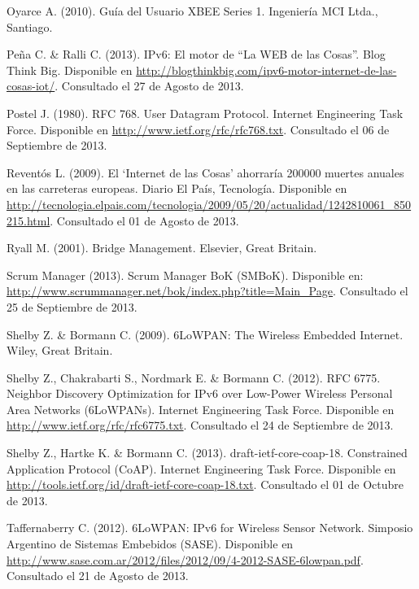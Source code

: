 \begin{spacing}{1.0}
\begin{thebibliography}{99}
Oyarce A. (2010).
\newblock Guía del Usuario XBEE Series 1.
\newblock Ingeniería MCI Ltda., Santiago.

Peña C. \& Ralli C. (2013).
\newblock IPv6: El motor de ``La WEB de las Cosas''. Blog Think Big.
\newblock Disponible en \url{http://blogthinkbig.com/ipv6-motor-internet-de-las-cosas-iot/}.
\newblock Consultado el 27 de Agosto de 2013.

Postel J. (1980).
\newblock RFC 768. User Datagram Protocol. Internet Engineering Task Force.
\newblock Disponible en \url{http://www.ietf.org/rfc/rfc768.txt}.
\newblock Consultado el 06 de Septiembre de 2013.

Reventós  L. (2009).
\newblock El `Internet de las Cosas' ahorraría 200000 muertes anuales en las carreteras europeas. Diario El País, Tecnología.
\newblock Disponible en \url{http://tecnologia.elpais.com/tecnologia/2009/05/20/actualidad/1242810061_850215.html}.
\newblock Consultado el 01 de Agosto de 2013.

Ryall M. (2001).
\newblock Bridge Management.
\newblock Elsevier, Great Britain.

Scrum Manager (2013).
\newblock Scrum Manager BoK (SMBoK).
\newblock Disponible en: \url{http://www.scrummanager.net/bok/index.php?title=Main_Page}.
\newblock Consultado el 25 de Septiembre de 2013.

Shelby Z. \& Bormann C. (2009).
\newblock 6LoWPAN: The Wireless Embedded Internet.
\newblock Wiley, Great Britain.

Shelby Z., Chakrabarti S., Nordmark E. \& Bormann C. (2012).
\newblock RFC 6775. Neighbor Discovery Optimization for IPv6 over Low-Power Wireless Personal Area Networks (6LoWPANs). Internet Engineering Task Force.
\newblock Disponible en \url{http://www.ietf.org/rfc/rfc6775.txt}.
\newblock Consultado el 24 de Septiembre de 2013.

Shelby Z., Hartke K. \& Bormann C. (2013).
\newblock draft-ietf-core-coap-18. Constrained Application Protocol (CoAP). Internet Engineering Task Force.
\newblock Disponible en \url{http://tools.ietf.org/id/draft-ietf-core-coap-18.txt}.
\newblock Consultado el 01 de Octubre de 2013.

Taffernaberry  C. (2012).
\newblock 6LoWPAN: IPv6 for Wireless Sensor Network.
\newblock Simposio Argentino de Sistemas Embebidos (SASE).
\newblock Disponible en \url{http://www.sase.com.ar/2012/files/2012/09/4-2012-SASE-6lowpan.pdf}.
\newblock Consultado el 21 de Agosto de 2013. 


\end{thebibliography}
\end{spacing}
